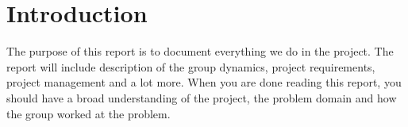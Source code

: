 \section{Introduction}
The purpose of this report is to document everything we do in the project. The report will include description of the group dynamics, project requirements, project management and a lot more. When you are done reading this report, you should have a broad understanding of the project, the problem domain and how the group worked at the problem.

